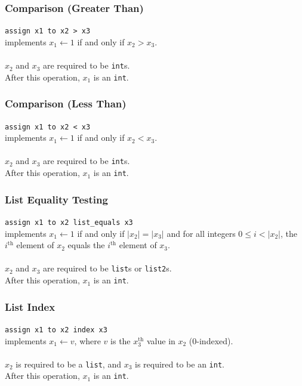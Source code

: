 \documentclass{report}
\begin{document}
\subsubsection{Comparison (Greater Than)}

\texttt{assign x1 to x2 > x3} \\
implements $x_1 \leftarrow 1$ if and only if $x_2 > x_3$. \\ \\
$x_2$ and $x_3$ are required to be \texttt{int}s. \\
After this operation, $x_1$ is an \texttt{int}.

\subsubsection{Comparison (Less Than)}

\texttt{assign x1 to x2 < x3} \\
implements $x_1 \leftarrow 1$ if and only if $x_2 < x_3$. \\ \\
$x_2$ and $x_3$ are required to be \texttt{int}s. \\
After this operation, $x_1$ is an \texttt{int}.

\subsubsection{List Equality Testing}

\texttt{assign x1 to x2 list\_equals x3} \\
implements $x_1 \leftarrow 1$ if and only if $|x_2| = |x_3|$ and for all integers $0 \le i < |x_2|$, the $i^{\textrm{th}}$ element of $x_2$ equals the $i^{\textrm{th}}$ element of $x_3$. \\ \\
$x_2$ and $x_3$ are required to be \texttt{list}s or \texttt{list2}s. \\
After this operation, $x_1$ is an \texttt{int}. 

\subsubsection{List Index}

\texttt{assign x1 to x2 index x3} \\
implements $x_1 \leftarrow v$, where $v$ is the $x_3^{\textrm{th}}$ value in $x_2$ (0-indexed). \\ \\
$x_2$ is required to be a \texttt{list}, and $x_3$ is required to be an \texttt{int}. \\
After this operation, $x_1$ is an \texttt{int}.
\end{document}
